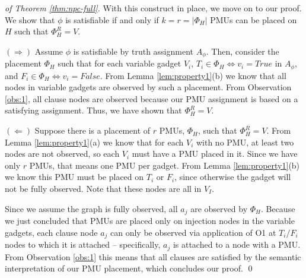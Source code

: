 \begin{proof}[of Theorem \ref{thm:npc-full}]
With this construct in place, we move on to our proof. We show that $\phi$ is satisfiable if and only if $k=r=|\Phi_H|$ PMUs
can be placed on $H$ such that $\Phi^R_{H}=V$.

$(\Rightarrow)$ Assume $\phi$ is satisfiable by truth assignment $A_{\phi}$. Then, consider the placement $\Phi_H$ such that for each variable gadget $V_i$, $T_i\in \Phi_H \Leftrightarrow v_i=True$
in $A_\phi$, and  $F_i\in \Phi_H \Leftrightarrow v_i=False$. From Lemma \ref{lem:property1}(b) we know that all nodes in variable gadgets are observed by such a placement. From Observation \ref{obs:1}, all clause nodes are observed because our PMU assignment is based on a satisfying assignment.
Thus, we have shown that $\Phi^R_{H}=V$.

$(\Leftarrow)$
Suppose there is a placement of $r$ PMUs, $\Phi_H$, such that $\Phi_H^R = V$.  From Lemma \ref{lem:property1}(a) we know that for each $V_i$ with no PMU, at least two nodes are not observed, so each $V_i$  must have a PMU placed in it. 
Since we have only $r$ PMUs, that means one PMU per gadget. From Lemma \ref{lem:property1}(b) we know this PMU must be placed on $T_i$ or $F_i$, since otherwise the gadget will not be fully observed. Note that these nodes are all in $V_I$.

Since we assume the graph is fully observed, all $a_j$ are observed by $\Phi_H$. Because we just concluded that PMUs are placed only on injection nodes in the variable gadgets, each clause node $a_j$ can only be observed via application of O1 at $T_i/F_i$ nodes to which it is attached -- specifically, $a_j$ is attached to a node with a PMU. From Observation \ref{obs:1} this means that all clauses are satisfied by the semantic interpretation of our PMU placement, which concludes our proof. \qed


\end{proof}



